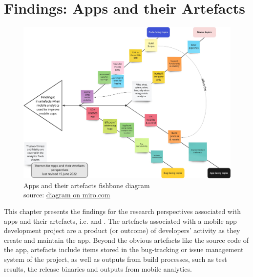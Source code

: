 \setchapterpreamble[u]{\margintoc}
\chapter{Findings: Apps and their Artefacts}

\begin{figure}
    \centering
    \includegraphics[width=0.8\linewidth]{images/rough-sketches/apps-and-their-artefacts-fishbone-15-jun-2022-d.jpeg}
    \caption[Apps and their artefacts fishbone diagram]{Apps and their artefacts fishbone diagram\\source: \href{https://miro.com/app/board/uXjVOts6mvo=/?share_link_id=402034254193}{diagram on miro.com}}
    \label{fig:apps-and-their-artefacts-fishbone}
\end{figure}


This chapter presents the  findings for the research perspectives associated with apps and their artefacts, i.e. \uartefacts and \iartefacts. The artefacts associated with a mobile app development project are a product (or outcome) of developers' activity as they create and maintain the app. Beyond the obvious artefacts like the source code of the app, artefacts include items stored in the bug-tracking or issue management system of the project, as well as outputs from build processes, such as test results, the release binaries and outputs from mobile analytics.

